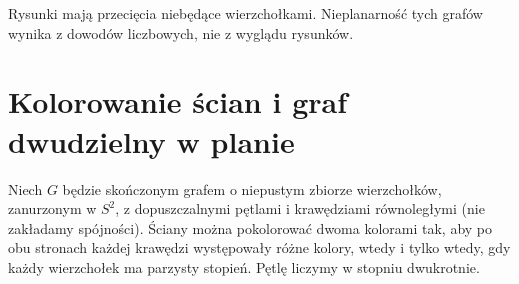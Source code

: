 \begin{center}

{\footnotesize Rysunki mają przecięcia niebędące wierzchołkami.
Nieplanarność tych grafów wynika z dowodów liczbowych, nie z wyglądu rysunków.}
\end{center}

\section{Kolorowanie ścian i graf dwudzielny w planie}
\label{sec:tg-planarne-color}

\begin{twierdzenie}
\label{thm:tg-face-two-color}
Niech $G$ będzie skończonym grafem o niepustym zbiorze
wierzchołków, zanurzonym w $S^2$, z dopuszczalnymi pętlami
i krawędziami równoległymi (nie zakładamy spójności).
Ściany można pokolorować dwoma kolorami tak, aby
po obu stronach każdej krawędzi występowały różne
kolory, wtedy i tylko wtedy, gdy każdy wierzchołek
ma parzysty stopień. Pętlę liczymy w stopniu dwukrotnie.
\end{twierdzenie}


